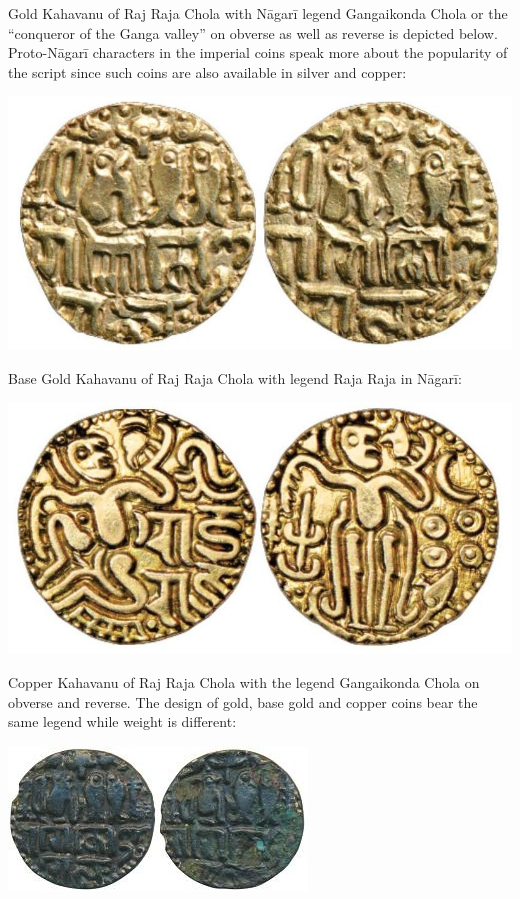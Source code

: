 Gold Kahavanu of Raj Raja Chola with Nāgarī legend Gangaikonda Chola or the “conqueror of the Ganga valley” on obverse as well as reverse is depicted below. Proto-Nāgarī characters in the imperial coins speak more about the popularity of the script since such coins are also available in silver and copper:

\vskip 4pt

\centerline{\includegraphics[scale=1]{"images/article-06/art06-fig10.jpg"}}

Base Gold Kahavanu of Raj Raja Chola with legend Raja Raja in Nāgarī:

\vskip 4pt

\centerline{\includegraphics[scale=1]{"images/article-06/art06-fig11.jpg"}}

Copper Kahavanu of Raj Raja Chola with the legend Gangaikonda Chola on obverse and reverse. The design of gold, base gold and copper coins bear the same legend while weight is different:

\centerline{\includegraphics[scale=0.6]{"images/article-06/art06-fig12.jpg"}}

